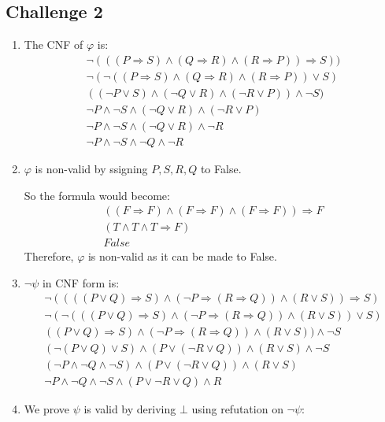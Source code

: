 \documentclass[11pt]{article}
\newcommand{\impl}{\mathbin{\Rightarrow}}
\begin{document}
\subsection*{Challenge 2}
\begin{enumerate}
\item
The CNF of $\varphi$ is:
\[
\begin{array}{lr}
    \neg(((P \impl S) \land (Q \impl R) \land (R \impl P) )\impl S))
\\  \neg(\neg((P \impl S) \land (Q \impl R) \land (R \impl P) ) \lor S)
\\  ((\neg P \lor S) \land (\neg Q \lor R) \land (\neg R \lor P)) \land \neg S)
\\  \neg P \land \neg S \land (\neg Q \lor R) \land (\neg R \lor P)
\\  \neg P \land \neg S \land (\neg Q \lor R) \land \neg R
\\  \neg P \land \neg S \land \neg Q \land \neg R
\end{array}
\]
\item
$\varphi$ is non-valid by ssigning $P, S, R, Q$ to False.

So the formula would become:
\[
\begin{array}{lr}
    ((F \impl F) \land (F \impl F) \land (F \impl F)) \impl F
\\  (T \land T \land T \impl F)
\\  False
\end{array}
\]
Therefore, $\varphi$ is non-valid as it can be made to False.
\item
$\neg \psi$ in CNF form is:
\[
\begin{array}{lr}
    \neg((((P \lor Q) \impl S) \land (\neg P \impl (R \impl Q)) \land (R \lor S)) \impl S)
\\  \neg(\neg(((P \lor Q) \impl S) \land (\neg P \impl (R \impl Q)) \land (R \lor S)) \lor S)
\\  ((P \lor Q) \impl S) \land (\neg P \impl (R \impl Q)) \land (R \lor S)) \land \neg S
\\  (\neg(P \lor Q) \lor S) \land
    (P \lor (\neg R \lor Q)) \land
    (R \lor S) \land \neg S
\\  (\neg P \land \neg Q \land \neg S) \land
    (P \lor (\neg R \lor Q)) \land
    (R \lor S)
\\  \neg P \land \neg Q \land \neg S \land
    (P \lor \neg R \lor Q) \land R
\end{array}
\]
\newpage
\item
We prove $\psi$ is valid by deriving $\bot$ using refutation on $\neg \psi$:


\end{enumerate}
\end{document}
